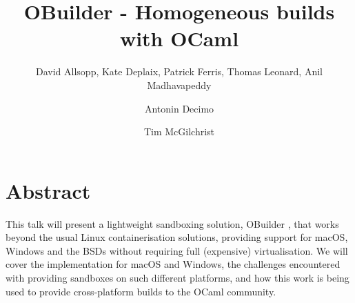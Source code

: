 \documentclass[manuscript,screen,review,sigplan]{acmart}
\begin{document}
\title{OBuilder - Homogeneous builds with OCaml}

\author{David Allsopp, Kate Deplaix, Patrick Ferris, Thomas Leonard, Anil Madhavapeddy}

\author{Antonin Decimo}

\author{Tim McGilchrist}

\renewcommand{\shortauthors}{McGilchrist}
\newcommand{\N}{\mathbb{T}}


\maketitle

\section{Abstract}

This talk will present a lightweight sandboxing solution, OBuilder \cite{Obuilder22}, that works beyond the usual Linux containerisation solutions, providing support for macOS, Windows and the BSDs without requiring full (expensive) virtualisation. We will cover the implementation for macOS and Windows, the challenges encountered with providing sandboxes on such different platforms, and how this work is being used to provide cross-platform builds to the OCaml community.
\end{document}
